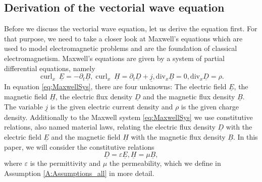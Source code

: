 \documentclass[a4paper,11pt]{article}
\newcommand{\cu}{\operatorname{curl}}
\renewcommand{\vec}[1]{\underline{#1}}
\begin{document}
\subsection{Derivation of the vectorial wave equation}
Before we discuss the vectorial wave equation, let us derive the equation first. For that purpose, we need to take a closer look at Maxwell's equations which are used to model electromagnetic problems and are the foundation of classical electromagnetism. Maxwell's equations are given by a system of partial differential equations, namely
\begin{subequations}\label{eq:MaxwellSys}
	\begin{equation}\label{eqn:Max1}
		\cu_x\ \vec E = -\partial_t \vec B,
	\end{equation}
	\begin{equation}\label{eqn:Max2}
		\cu_x\ \vec H = \partial_t\vec D + \vec j,
	\end{equation}
	\begin{equation}\label{eqn:Max3}
		\mathrm{div}_x \vec B = 0,
	\end{equation}
	\begin{equation}\label{eqn:Max4}
		\mathrm{div}_x \vec D = \rho.
	\end{equation}		
\end{subequations}
In equation \eqref{eq:MaxwellSys}, there are four unknowns: The electric field $\vec E$, the magnetic field $\vec H$, the electric flux density $\vec D $  and the magnetic flux density $\vec B$. The variable $\vec j$ is the given electric current density and $\rho$ is the given charge density. 
Additionally to the Maxwell system \eqref{eq:MaxwellSys} we use constitutive relations, also named material laws, relating the electric flux density $\vec D $ with the electric field $\vec E$ and the magnetic field $\vec H$ with the magnetic flux density $\vec B$. In this paper, we will consider the  constitutive relations
\begin{subequations}\label{eq:MaterialLaw}
	\begin{equation}
		\vec D=\varepsilon \vec E,
	\end{equation}
	\begin{equation}
		\vec H=\mu \vec B,
	\end{equation}
\end{subequations}
where $\varepsilon$ is the permittivity and $\mu$ the permeability, which we define in Assumption \ref{A:Assumptions_all} in more detail.	  
\end{document}

